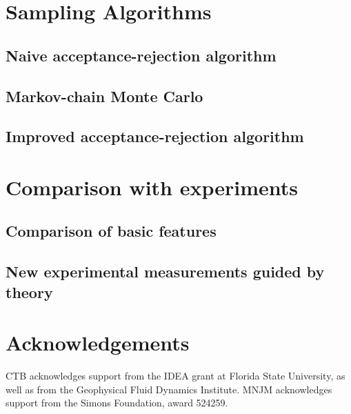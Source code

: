 \documentclass[11pt]{article}
\begin{document}
\section{Sampling Algorithms}

\subsection{Naive acceptance-rejection algorithm}

\subsection{Markov-chain Monte Carlo}

\subsection{Improved acceptance-rejection algorithm}


\section{Comparison with experiments}

\subsection{Comparison of basic features}

\subsection{New experimental measurements guided by theory}

\section*{Acknowledgements}
CTB acknowledges support from the IDEA grant at Florida State University, as well as from the Geophysical Fluid Dynamics Institute. 
MNJM acknowledges support from the Simons Foundation, award 524259. 



\end{document}
